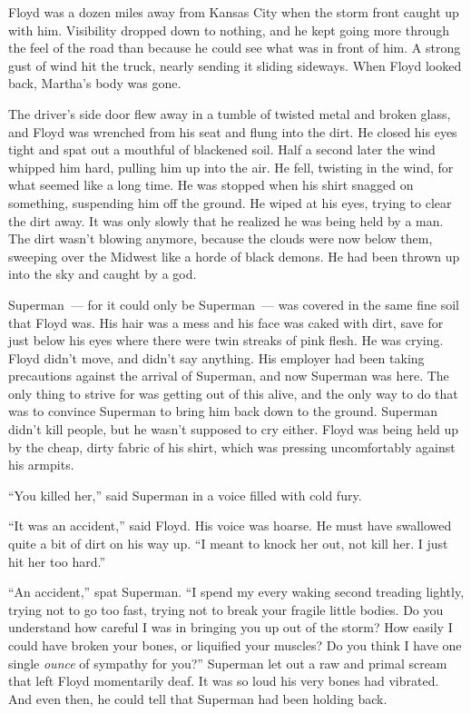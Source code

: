 \documentclass[ebook,12pt]{memoir}
\begin{document}
Floyd was a dozen miles away from Kansas City when the storm front
caught up with him. Visibility dropped down to nothing, and he kept
going more through the feel of the road than because he could see what
was in front of him. A strong gust of wind hit the truck, nearly sending
it sliding sideways. When Floyd looked back, Martha's body was gone.

The driver's side door flew away in a tumble of twisted metal and broken
glass, and Floyd was wrenched from his seat and flung into the dirt. He
closed his eyes tight and spat out a mouthful of blackened soil. Half a
second later the wind whipped him hard, pulling him up into the air. He
fell, twisting in the wind, for what seemed like a long time. He was
stopped when his shirt snagged on something, suspending him off the
ground. He wiped at his eyes, trying to clear the dirt away. It was only
slowly that he realized he was being held by a man. The dirt wasn't
blowing anymore, because the clouds were now below them, sweeping over
the Midwest like a horde of black demons. He had been thrown up into the
sky and caught by a god.

Superman~--- for it could only be Superman~--- was covered in the same
fine soil that Floyd was. His hair was a mess and his face was caked
with dirt, save for just below his eyes where there were twin streaks of
pink flesh. He was crying. Floyd didn't move, and didn't say anything.
His employer had been taking precautions against the arrival of
Superman, and now Superman was here. The only thing to strive for was
getting out of this alive, and the only way to do that was to convince
Superman to bring him back down to the ground. Superman didn't kill
people, but he wasn't supposed to cry either. Floyd was being held up by
the cheap, dirty fabric of his shirt, which was pressing uncomfortably
against his armpits.

``You killed her,'' said Superman in a voice filled with cold fury.

``It was an accident,'' said Floyd. His voice was hoarse. He must have
swallowed quite a bit of dirt on his way up. ``I meant to knock her out,
not kill her. I just hit her too hard.''

``An accident,'' spat Superman. ``I spend my every waking second
treading lightly, trying not to go too fast, trying not to break your
fragile little bodies. Do you understand how careful I was in bringing
you up out of the storm? How easily I could have broken your bones, or
liquified your muscles? Do you think I have one single \emph{ounce} of
sympathy for you?'' Superman let out a raw and primal scream that left
Floyd momentarily deaf. It was so loud his very bones had vibrated. And
even then, he could tell that Superman had been holding back.
\end{document}
